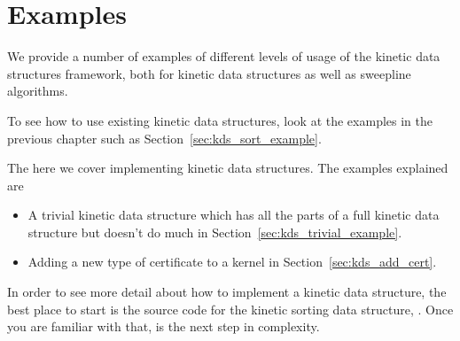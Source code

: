 \section{Examples\label{sec:kds_examples}}


We provide a number of examples of different levels of usage of the
kinetic data structures framework, both for kinetic data structures as
well as sweepline algorithms.

To see how to use existing kinetic data structures, look at the
examples in the previous chapter such as
Section~\ref{sec:kds_sort_example}. 

The here we cover implementing kinetic data structures. The examples
explained are
\begin{itemize}
\item A trivial kinetic data structure which has all the parts of a
full kinetic data structure but doesn't do much in
Section~\ref{sec:kds_trivial_example}.
\item Adding a new type of certificate to a kernel in
  Section~\ref{sec:kds_add_cert}.
\end{itemize}

In order to see more detail about how to implement a kinetic data
structure, the best place to start is the source code for the kinetic
sorting data structure, . Once you
are familiar with that,  is the next step in complexity.




